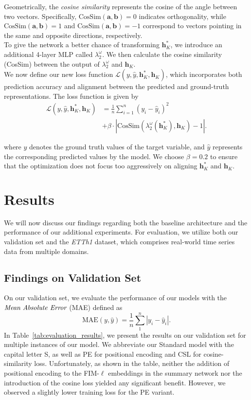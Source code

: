\documentclass{article}
\theoremstyle{plain}
\theoremstyle{definition}
\theoremstyle{remark}
\begin{document}
Geometrically, the \emph{cosine similarity} represents the cosine of the angle between two vectors. Specifically, $\text{CosSim}(\mathbf{a}, \mathbf{b}) = 0$ indicates orthogonality, while $\text{CosSim}(\mathbf{a}, \mathbf{b}) = 1$ and $\text{CosSim}(\mathbf{a}, \mathbf{b}) = -1$ correspond to vectors pointing in the same and opposite directions, respectively.\\
To give the network a better chance of transforming $\mathbf{h}^*_K$, we introduce an additional 4-layer MLP called $\lambda_2^{\omega}$. We then calculate the cosine similarity (CosSim) between the output of $\lambda_2^{\omega}$ and $\mathbf{h}_K$.\\
We now define our new loss function $\mathcal{L}(y, \hat{y}, \mathbf{h}^*_K, \mathbf{h}_K)$, which incorporates both prediction accuracy and alignment between the predicted and ground-truth representations. The loss function is given by
\[
\begin{aligned}
\mathcal{L}(y,\hat{y},\mathbf{h}^*_K,\mathbf{h}_K) &= 
\frac{1}{n}\sum_{i=1}^{n}(y_i - \hat{y}_i)^2   \\
&+ \beta \cdot |\text{CosSim}(\lambda_2^{\omega}(\mathbf{h}^*_K),\mathbf{h}_K) - 1|.
\end{aligned}
\]


where $y$ denotes the ground truth values of the target variable, and $\hat{y}$ represents the corresponding predicted values by the model. We choose $\beta = 0.2$ to ensure that the optimization does not focus too aggressively on aligning $\mathbf{h}^*_K$ and $\mathbf{h}_K$.






\section{Results}
\label{sec:results}

We will now discuss our findings regarding both the baseline architecture and the performance of our additional experiments. For evaluation, we utilize both our validation set and the \emph{ETTh1} dataset, which comprises real-world time series data from multiple domains.
\subsection{Findings on Validation Set}
On our validation set, we evaluate the performance of our models with the 
$\emph{Mean Absolute Error}$ (MAE) defined as
\[
\text{MAE}(y,\hat{y}) = \frac{1}{n}\sum_{1}^{n}|y_i-\hat{y}_i|.
\]
In Table~\ref{tab:evaluation_results}, we present the results on our validation set for multiple instances of our model. We abbreviate our Standard model with the capital letter S, as well as PE for positional encoding and CSL for cosine-similarity loss. Unfortunately, as shown in the table, neither the addition of positional encoding to the FIM-$\ell$ embeddings in the summary network nor the introduction of the cosine loss yielded any significant benefit. However, we observed a slightly lower training loss for the PE variant.
\end{document}
